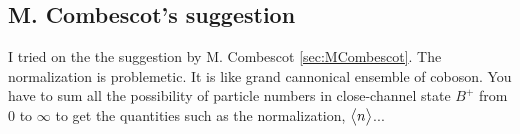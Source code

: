 \subsection{M. Combescot's suggestion}
I tried on the the suggestion by M. Combescot \ref{sec:MCombescot}.  The normalization is problemetic.  It is like grand cannonical ensemble of coboson.  You have to sum all the possibility of particle numbers in close-channel state $B^+$ from 0 to $\infty$ to get the quantities such as the normalization, $\bigl<{n}\bigr>$... 